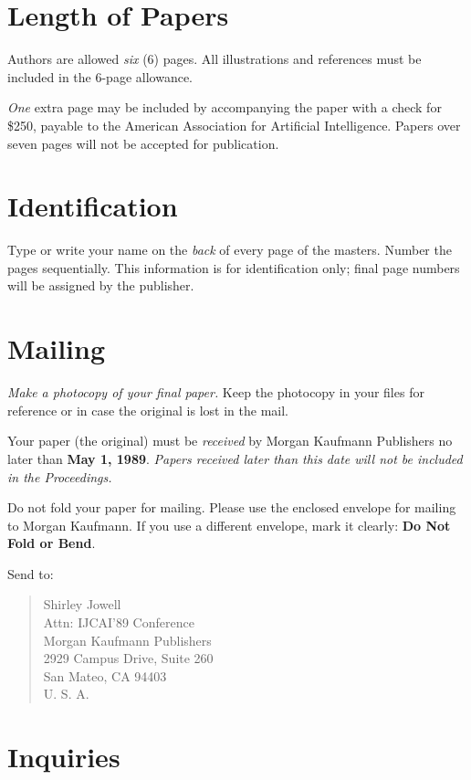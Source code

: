 \section{Length of Papers}

Authors are allowed {\em six\/} (6) pages.  All illustrations and
references must be included in the 6-page allowance.  

{\em One} extra page may be included by accompanying the paper with a check
for \$250, payable to the American Association for Artificial Intelligence.
Papers over seven pages will not be accepted for publication.

\section{Identification}

Type or write your name on the {\em back\/} of every page of the masters.
Number the pages sequentially.  This information is for identification only;
final page numbers will be assigned by the publisher.

\section{Mailing}

{\em Make a photocopy of your final paper.}  Keep the photocopy in your
files for reference or in case the original is lost in the mail.

Your paper (the original) must be {\em received\/} by Morgan Kaufmann
Publishers no later than {\bf May 1, 1989}.  {\em Papers received later
than this date will not be included in the Proceedings.}

Do not fold your paper for mailing.  Please use the enclosed envelope for
mailing to Morgan Kaufmann.  If you use a different envelope, mark it
clearly: {\bf Do Not Fold or Bend}.

Send to:
\begin{quote}
Shirley Jowell \\
Attn: IJCAI'89 Conference \\
Morgan Kaufmann Publishers \\
2929 Campus Drive, Suite 260 \\
San Mateo, CA \hspace{1em} 94403\\
U. S. A.
\end{quote}

\section{Inquiries}

